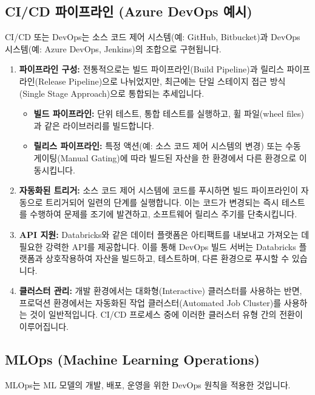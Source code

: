 \documentclass[11pt,a4paper]{article}
\theoremstyle{definition}
\begin{document}
\subsection{CI/CD 파이프라인 (Azure DevOps 예시)}
CI/CD 또는 DevOps는 소스 코드 제어 시스템(예: GitHub, Bitbucket)과 DevOps 시스템(예: Azure DevOps, Jenkins)의 조합으로 구현됩니다.

\begin{enumerate}
    \item \textbf{파이프라인 구성:}
    전통적으로는 빌드 파이프라인(Build Pipeline)과 릴리스 파이프라인(Release Pipeline)으로 나뉘었지만, 최근에는 단일 스테이지 접근 방식(Single Stage Approach)으로 통합되는 추세입니다.
    \begin{itemize}
        \item \textbf{빌드 파이프라인:} 단위 테스트, 통합 테스트를 실행하고, 휠 파일(wheel files)과 같은 라이브러리를 빌드합니다.
        \item \textbf{릴리스 파이프라인:} 특정 액션(예: 소스 코드 제어 시스템의 변경) 또는 수동 게이팅(Manual Gating)에 따라 빌드된 자산을 한 환경에서 다른 환경으로 이동시킵니다.
    \end{itemize}

    \item \textbf{자동화된 트리거:}
    소스 코드 제어 시스템에 코드를 푸시하면 빌드 파이프라인이 자동으로 트리거되어 일련의 단계를 실행합니다. 이는 코드가 변경되는 즉시 테스트를 수행하여 문제를 조기에 발견하고, 소프트웨어 릴리스 주기를 단축시킵니다.

    \item \textbf{API 지원:}
    Databricks와 같은 데이터 플랫폼은 아티팩트를 내보내고 가져오는 데 필요한 강력한 API를 제공합니다. 이를 통해 DevOps 빌드 서버는 Databricks 플랫폼과 상호작용하여 자산을 빌드하고, 테스트하며, 다른 환경으로 푸시할 수 있습니다.

    \item \textbf{클러스터 관리:}
    개발 환경에서는 대화형(Interactive) 클러스터를 사용하는 반면, 프로덕션 환경에서는 자동화된 작업 클러스터(Automated Job Cluster)를 사용하는 것이 일반적입니다. CI/CD 프로세스 중에 이러한 클러스터 유형 간의 전환이 이루어집니다.
\end{enumerate}

\subsection{MLOps (Machine Learning Operations)}
MLOps는 ML 모델의 개발, 배포, 운영을 위한 DevOps 원칙을 적용한 것입니다.
\end{document}
